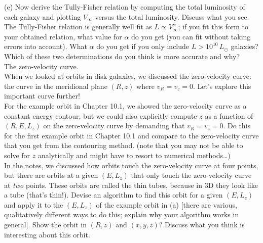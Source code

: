\documentclass[12pt]{article}
\begin{document}
(e) Now derive the Tully-Fisher relation by computing the total
luminosity of each galaxy and plotting $V_\infty$ versus the total
luminosity. Discuss what you see. The Tully-Fisher relation is
generally well fit as $L \propto V_\infty^\alpha$; if you fit this form
to your obtained relation, what value for $\alpha$ do you get (you can
fit without taking errors into account). What $\alpha$ do you get if
you only include $L > 10^{10}\,L_\odot$ galaxies? Which of these two
determinations do you think is more accurate and why?\\

 The zero-velocity curve.\\

When we looked at orbits in disk galaxies, we discussed the
zero-velocity curve: the curve in the meridional plane $(R,z)$ where
$v_R = v_z = 0$. Let's explore this important curve further!\\

 For the example orbit in Chapter 10.1, we showed
the zero-velocity curve as a constant energy contour, but we could
also explicitly compute $z$ as a function of $(R,E,L_z)$ on the
zero-velocity curve by demanding that $v_R = v_z = 0$. Do this for the
first example orbit in Chapter 10.1 and compare to the zero-velocity
curve that you get from the contouring method. (note that you may not
be able to solve for $z$ analytically and might have to resort to
numerical methods\ldots)\\

 In the notes, we discussed how orbits touch the
zero-velocity curve at four points, but there are orbits at a given
$(E,L_z)$ that only touch the zero-velocity curve at \emph{two}
points. These orbits are called the thin tubes, because in 3D they
look like a tube (that's thin!). Devise an algorithm to find this
orbit for a given $(E,L_z)$ and apply it to the $(E,L_z)$ of the
example orbit in (a) [there are various, qualitatively different ways
  to do this; explain why your algorithm works in general]. Show the
orbit in $(R,z)$ and $(x,y,z)$? Discuss what you think is interesting
about this orbit.
\end{document}
